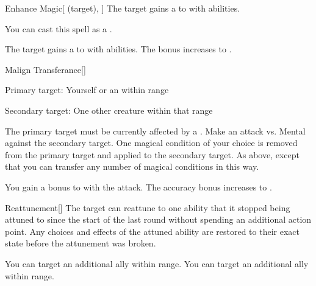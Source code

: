 \lowercase{\hypertarget{spell:Enhance Magic}{}}\label{spell:Enhance Magic}
\begin{attuneability}[Rank 3]{\hypertarget{spell:Enhance Magic}{Enhance Magic}}[ (target), ]
The target gains a   to  with  abilities.

You can cast this spell as a .

\rankline
{} The target gains a   to  with  abilities.
 The bonus increases to .
\end{attuneability}
\vspace{0.25em}



\lowercase{\hypertarget{spell:Malign Transferance}{}}\label{spell:Malign Transferance}
\begin{freeability}[Rank 3]{\hypertarget{spell:Malign Transferance}{Malign Transferance}}[]

Primary target: Yourself or an  within \rngmed range
\par\noindent
Secondary target: One other creature within that range

The primary target must be currently affected by a  .
Make an attack vs. Mental against the secondary target.
\hit One magical condition of your choice is removed from the primary target and applied to the secondary target.
\crit As above, except that you can transfer any number of magical conditions in this way.

\rankline
{} You gain a  bonus to  with the attack.
 The accuracy bonus increases to .
\end{freeability}
\vspace{0.25em}



\lowercase{\hypertarget{spell:Reattunement}{}}\label{spell:Reattunement}
\begin{freeability}[Rank 3]{\hypertarget{spell:Reattunement}{Reattunement}}[]
The target can reattune to one ability that it stopped being attuned to since the start of the last round without spending an additional action point.
Any choices and effects of the attuned ability are restored to their exact state before the attunement was broken.

\rankline
{} You can target an additional ally within range.
 You can target an additional ally within range.
\end{freeability}
\vspace{0.25em}



